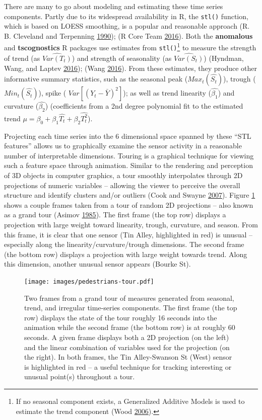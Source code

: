 \documentclass[12pt,]{isuthesis}
\let\rmarkdownfootnote\footnote%
\def\footnote{\protect\rmarkdownfootnote}
\begin{document}
There are many to go about modeling and estimating these time series
components. Partly due to its widespread availability in R, the
\texttt{stl()} function, which is based on LOESS smoothing, is a popular
and reasonable approach (R. B. Cleveland and Terpenning
\protect\hyperlink{ref-stl}{1990}); (R Core Team
\protect\hyperlink{ref-RCore}{2016}). Both the \textbf{anomalous} and
\textbf{tscognostics} R packages use estimates from
\texttt{stl()}\footnote{If no seasonal component exists, a Generalized
  Additive Models is used to estimate the trend component (Wood
  \protect\hyperlink{ref-mgcv}{2006}).} to measure the strength of trend
(as \(\hat{Var(T_t)}\)) and strength of seasonality (as
\(\hat{Var(S_t)}\)) (Hyndman, Wang, and Laptev
\protect\hyperlink{ref-anomalous}{2016}); (Wang
\protect\hyperlink{ref-tscognostics}{2016}). From these estimates, they
produce other informative summary statistics, such as the seasonal peak
(\(Max_{t}(\hat{S_t})\)), trough (\(Min_{t}(\hat{S_t})\)), spike (
\(Var[(Y_t - \bar{Y})^2]\)); as well as trend linearity
(\(\hat{\beta_1}\)) and curvature (\(\hat{\beta_2}\)) (coefficients from
a 2nd degree polynomial fit to the estimated trend
\(\mu = \beta_0 + \beta_1\hat{T_t} + \beta_2\hat{T_t^2}\)).

Projecting each time series into the 6 dimensional space spanned by
these ``STL features'' allows us to graphically examine the sensor
activity in a reasonable number of interpretable dimensions. Touring is
a graphical technique for viewing such a feature space through
animation. Similar to the rendering and perception of 3D objects in
computer graphics, a tour smoothly interpolates through 2D projections
of numeric variables -- allowing the viewer to perceive the overall
structure and identify clusters and/or outliers (Cook and Swayne
\protect\hyperlink{ref-ggobi:2007}{2007}). Figure
\ref{fig:pedestrians-tour} shows a couple frames taken from a tour of
random 2D projections -- also known as a grand tour (Asimov
\protect\hyperlink{ref-grand-tour}{1985}). The first frame (the top row)
displays a projection with large weight toward linearity, trough,
curvature, and season. From this frame, it is clear that one sensor (Tin
Alley, highlighted in red) is unusual -- especially along the
linearity/curvature/trough dimensions. The second frame (the bottom row)
displays a projection with large weight towards trend. Along this
dimension, another unusual sensor appears (Bourke St).

\begin{figure}
\centering
\texttt{[image: images/pedestrians-tour.pdf]}
\caption{\label{fig:pedestrians-tour}Two frames from a grand tour of
measures generated from seasonal, trend, and irregular time-series
components. The first frame (the top row) displays the state of the tour
roughly 16 seconds into the animation while the second frame (the bottom
row) is at roughly 60 seconds. A given frame displays both a 2D
projection (on the left) and the linear combination of variables used
for the projection (on the right). In both frames, the Tin Alley-Swanson
St (West) sensor is highlighted in red -- a useful technique for
tracking interesting or unusual point(s) throughout a tour.}
\end{figure}
\end{document}
